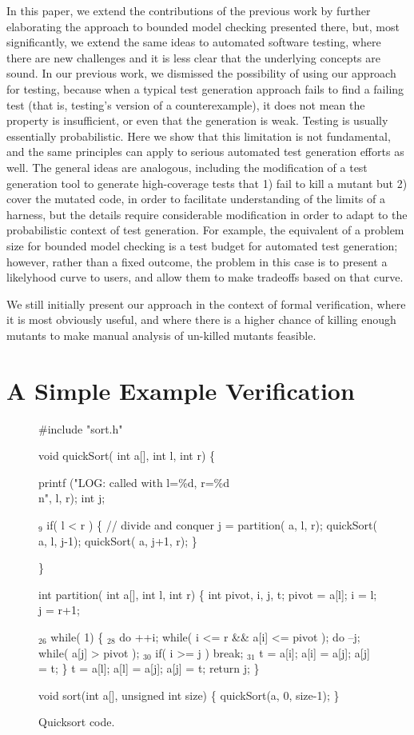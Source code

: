 \documentclass{svjour3}
\begin{document}
In this paper, we extend the contributions of the previous work by
further elaborating the approach to bounded model checking presented
there, but, most significantly, we extend the same ideas to automated
software testing, where there are new challenges and it is less clear
that the underlying concepts are sound.  In our previous work, we
dismissed the possibility of using our approach for testing, because
when a typical test generation approach fails to find a failing test
(that is, testing's version of a counterexample), it does not mean the
property is insufficient, or even that the generation is weak.
Testing is usually essentially probabilistic.  Here we show that this
limitation is not fundamental, and the same principles can apply to
serious automated test generation efforts as well.  The general ideas
are analogous, including the modification of a test generation tool to
generate high-coverage tests that 1) fail to kill a mutant but 2)
cover the mutated code, in order to facilitate understanding of the
limits of a harness, but the details require considerable modification
in order to adapt to the probabilistic context of test generation.
For example, the equivalent of a problem size for bounded model
checking is a test budget for automated test generation; however,
rather than a fixed outcome, the problem in this case is to present a
likelyhood curve to users, and allow them to make tradeoffs based on
that curve.

We still initially present our approach in the context of formal
verification, where it is most obviously useful, and where there is a
higher chance of killing enough mutants to make manual analysis of
un-killed mutants feasible.

\section{A Simple Example Verification}

\begin{figure}
{%
\begin{code}
 \#include "sort.h"

 void quickSort( int a[], int l, int r)
 \{

   printf ("LOG: called with l=\%d, r=\%d\\n", l, r); 
   int j;

{$_9$}  if( l < r ) 
     \{
       // divide and conquer
       j = partition( a, l, r);
       quickSort( a, l, j-1);
       quickSort( a, j+1, r);
     \}
  
 \}

 int partition( int a[], int l, int r) \{
   int pivot, i, j, t;
   pivot = a[l];
   i = l; j = r+1;
  
{$_{26}$} while( 1)
     \{
{$_{28}$}     do ++i; while( i <= r \&\& a[i] <= pivot );
       do --j; while( a[j] > pivot );
{$_{30}$}     if( i >= j ) break;
{$_{31}$}     t = a[i]; a[i] = a[j]; a[j] = t;
     \}
   t = a[l]; a[l] = a[j]; a[j] = t;
   return j;
 \}


 void sort(int a[], unsigned int size) \{
   quickSort(a, 0, size-1);
 \}
\end{code}
}
\caption{Quicksort code.}
\label{fig:qsort}
\end{figure}
\end{document}
